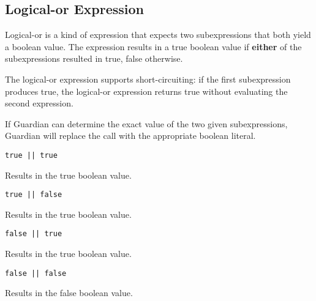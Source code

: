 
\subsection{Logical-or Expression}
{
	Logical-or is a kind of expression that expects two subexpressions that
	both yield a boolean value. The expression results in a true boolean value
	if \textbf{either} of the subexpressions resulted in true, false otherwise.
	
	The logical-or expression supports short-circuiting: if the first
	subexpression produces true, the logical-or expression returns true
	without evaluating the second expression.
	
	If Guardian can determine the exact value of the two given subexpressions,
	Guardian will replace the call with the appropriate boolean literal.
	
	\begin{itemize}
	{
		\item[] \lstinline[language=MAIA, columns=fixed]@true || true@
		
			Results in the true boolean value.
			
		\item[] \lstinline[language=MAIA, columns=fixed]@true || false@
		
			Results in the true boolean value.
			
		\item[] \lstinline[language=MAIA, columns=fixed]@false || true@
		
			Results in the true boolean value.
			
		\item[] \lstinline[language=MAIA, columns=fixed]@false || false@
		
			Results in the false boolean value.
	}
	\end{itemize}
}
